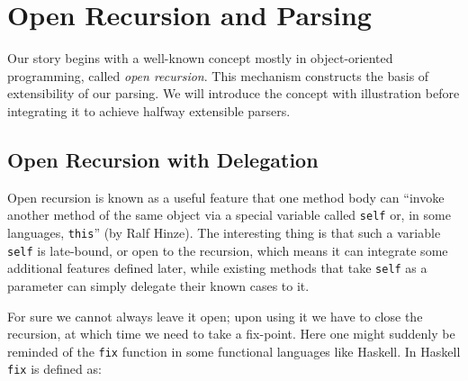 \section{Open Recursion and Parsing}\label{sec:openandparsing}

Our story begins with a well-known concept mostly in object-oriented programming, called \textit{open recursion}. This mechanism
constructs the basis of extensibility of our parsing. We will introduce the concept with illustration before integrating
it  to achieve halfway extensible parsers.

\subsection{Open Recursion with Delegation}\label{subsec:openrecursion}

Open recursion is known as a useful feature that one method body can ``invoke another method of the same object via a special variable called \lstinline{self} or, in some languages, \lstinline[keywords={}]{this}'' (by Ralf Hinze). The interesting thing is that such a variable \lstinline{self} is late-bound, or open to the recursion, which means it can integrate some additional features defined later, while existing methods that take \lstinline{self} as a parameter can simply delegate their known cases to it.

For sure we cannot always leave it open; upon using it we have to close the recursion, at which time we need to take a fix-point. Here one might suddenly be reminded of the \lstinline{fix} function in some functional languages like Haskell. In Haskell \lstinline{fix} is defined as:

